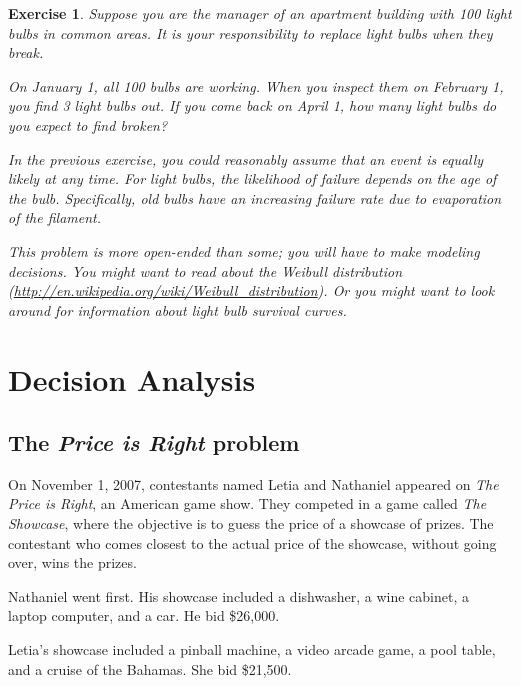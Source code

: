 \documentclass[12pt]{book}
\theoremstyle{exercise}
\newtheorem{exercise}{Exercise}[chapter]
\begin{document}
\begin{exercise}

Suppose you are the manager of an apartment building with
100 light bulbs in common areas.  It is your responsibility
to replace light bulbs when they break.

On January 1, all 100 bulbs are working.  When you inspect
them on February 1, you find 3 light bulbs out.  If you
come back on April 1, how many light bulbs do you expect to
find broken?

In the previous exercise, you could reasonably assume that an event is
equally likely at any time.  For light bulbs, the likelihood of
failure depends on the age of the bulb.  Specifically, old bulbs
have an increasing failure rate due to evaporation of the filament.

This problem is more open-ended than some; you will have to make
modeling decisions.  You might want to read about the Weibull
distribution
(\url{http://en.wikipedia.org/wiki/Weibull_distribution}).
Or you might want to look around for information about
light bulb survival curves.

\end{exercise}



\chapter{Decision Analysis}
\label{decisionanalysis}

\section{The {\it Price is Right} problem}

On November 1, 2007, contestants named Letia and Nathaniel appeared
on {\it The Price is Right}, an American game show.  They competed in
a game called {\it The Showcase}, where the objective is to guess the price
of a showcase of prizes.  The contestant who comes closest to the
actual price of the showcase, without going over, wins the prizes.

Nathaniel went first.  His showcase included a dishwasher, a wine
cabinet, a laptop computer, and a car.  He bid \$26,000.

Letia's showcase included a pinball machine, a video arcade game, a
pool table, and a cruise of the Bahamas.  She bid \$21,500.
\end{document}
